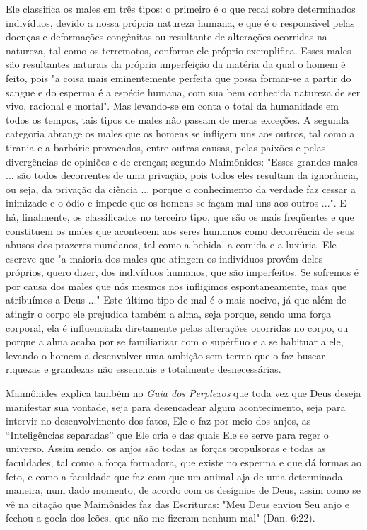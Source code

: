 Ele classifica os males em três tipos: o primeiro é o que recai sobre
determinados indivíduos, devido a nossa própria natureza humana, e que é
o responsável pelas doenças e deformações congênitas ou resultante de
altera­ções ocorridas na natureza, tal como os terremotos, conforme ele
próprio exem­plifica. Esses males são resultantes naturais da própria
imperfeição da matéria da qual o homem é feito, pois "a coisa mais
eminentemente perfeita que possa formar-se a partir do sangue e do
esperma é a espécie humana, com sua bem conhecida natureza de ser vivo,
racional e mortal". Mas levando-se em conta o total da humanidade em
todos os tempos, tais tipos de males não passam de meras exceções. A
segunda categoria abrange os males que os homens se infli­gem uns aos
outros, tal como a tirania e a barbárie provocados, entre outras causas,
pelas paixões e pelas divergências de opiniões e de crenças; segundo
Maimônides: "Esses grandes males ... são todos decorrentes de uma
privação, pois todos eles resultam da ignorância, ou seja, da privação
da ciência ... por­que o conhecimento da verdade faz cessar a inimizade
e o ódio e impede que os homens se façam mal uns aos outros ...". E há,
finalmente, os classificados no terceiro tipo, que são os mais
freqüentes e que constituem os males que acontecem aos seres humanos
como decorrência de seus abusos dos prazeres mundanos, tal como a
bebida, a comida e a luxúria. Ele escreve que "a maioria dos males que
atingem os indivíduos provêm deles próprios, quero dizer, dos indivíduos
humanos, que são imperfeitos. Se sofremos é por causa dos males que nós
mesmos nos infligimos espontaneamente, mas que atribuímos a Deus ..."
Este último tipo de mal é o mais nocivo, já que além de atingir o corpo
ele pre­judica também a alma, seja porque, sendo uma força corporal, ela
é influencia­da diretamente pelas alterações ocorridas no corpo, ou
porque a alma acaba por se familiarizar com o supérfluo e a se habituar
a ele, levando o homem a desenvolver uma ambição sem termo que o faz
buscar riquezas e grandezas não essenciais e totalmente desnecessárias.

Maimônides explica também no \emph{Guia dos Perplexos} que toda vez que
Deus deseja manifestar sua vontade, seja para desencadear algum
aconteci­mento, seja para intervir no desenvolvimento dos fatos, Ele o
faz por meio dos anjos, as ``Inteligências separadas'' que Ele cria e das
quais Ele se serve para reger o universo. Assim sendo, os anjos são
todas as forças propulsoras e todas as faculdades, tal como a força
formadora, que existe no esperma e que dá formas 
ao feto, e como a faculdade que faz com que um animal aja de uma
deter­minada maneira, num dado momento, de acordo com os desígnios de
Deus, assim como se vê na citação que Maimônides faz das Escrituras:
"Meu Deus en­viou Seu anjo e fechou a goela dos leões, que não me
fizeram nenhum mal" (Dan. 6:22).

